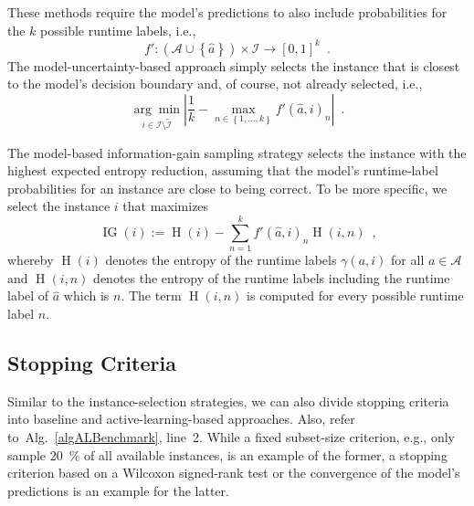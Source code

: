 \documentclass[runningheads]{llncs}
\begin{document}
These methods require the model's predictions to also include probabilities for the $k$ possible runtime labels, i.e., 
\begin{equation}
  f'\!: \left(\mathcal{A} \cup \left\lbrace \hat{a} \right\rbrace\right) \times \mathcal{I} \rightarrow \left[0, 1\right]^k  \enspace \textrm{.}
\end{equation}
The model-uncertainty-based approach simply selects the instance that is closest to the model's decision boundary and, of course, not already selected, i.e.,
\begin{equation}
  \underset{i \in \mathcal{I} \setminus \tilde{\mathcal{I}}}{\arg\min} \left\lvert \frac{1}{k} - \max_{n \in \left\lbrace 1, \dots, k \right\rbrace} f'\!\left(\hat{a}, i\right)_{n} \right\rvert \enspace \textrm{.}
\end{equation}

The model-based information-gain sampling strategy selects the instance with the highest expected entropy reduction, assuming that the model's runtime-label probabilities for an instance are close to being correct.
To be more specific, we select the instance $i$ that maximizes
\begin{equation}
  \operatorname{IG}\!\left(i\right) := \operatorname{H}\!\left(i\right) - \sum_{n = 1}^{k} f'\!\left(\hat{a}, i\right)_{n} \operatorname{H}\!\left(i, n\right) \enspace \textrm{,}
\end{equation}
whereby $\operatorname{H}\!\left(i\right)$ denotes the entropy of the runtime labels $\gamma\!\left(a, i\right)$ for all $a \in \mathcal{A}$ and $\operatorname{H}\!\left(i, n\right)$ denotes the entropy of the runtime labels including the runtime label of $\hat{a}$ which is $n$.
The term $\operatorname{H}\!\left(i, n\right)$ is computed for every possible runtime label $n$.


\subsection{Stopping Criteria}
\label{sec:main3}
Similar to the instance-selection strategies, we can also divide stopping criteria into baseline and active-learning-based approaches.
Also, refer to~Alg.~\ref{algALBenchmark}, line~2.
While a fixed subset-size criterion, e.g., only sample \SI{20}{\%} of all available instances, is an example of the former, a stopping criterion based on a Wilcoxon signed-rank test or the convergence of the model's predictions is an example for the latter.
\end{document}
